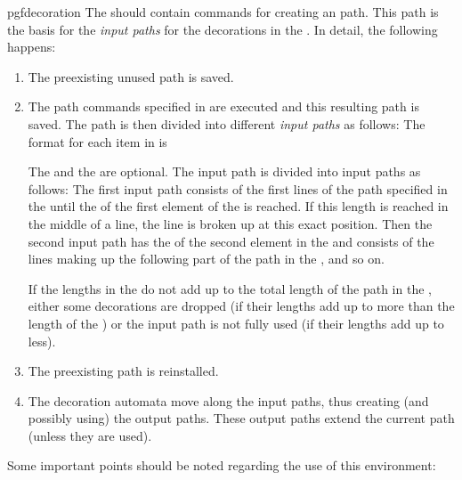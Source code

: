 \begin{environment}{{pgfdecoration}}
  The  should contain commands for creating
  an path. This path is the basis for the \emph{input paths}
  for the decorations in the . In detail, the
  following happens:
  \begin{enumerate}
  \item
    The preexisting unused path is saved.
  \item
    The path commands specified in  are
    executed and this resulting path is saved. The path is then
    divided into different \emph{input paths} as follows:
    The format for each item in  is
    \begin{quote}
    \end{quote}
    The  and the  are optional. The
    input path is divided into input paths as follows: The first input
    path consists of the first lines of the path specified in the
     until the   of the first
    element of the  is reached. If this length
    is reached in the middle of a line, the line is broken up at this
    exact position. Then the second input path has the 
    of the second element in the  and consists
    of the lines making up the following  part of the
    path in the , and so on.

    If the lengths in the 
    do not add up to the total length of the path in the
    , either some  decorations are dropped
    (if their lengths add up to more than the length of the
    ) or
    the input path is not fully used (if their lengths  add up to less).
  \item
    The preexisting path is reinstalled.
  \item
    The decoration automata move along the input paths, thus creating
    (and  possibly using) the output paths. These output paths extend
     the current path (unless they are used).
  \end{enumerate}
	
  Some important points should be noted regarding the use of this
  environment:


\end{environment}
